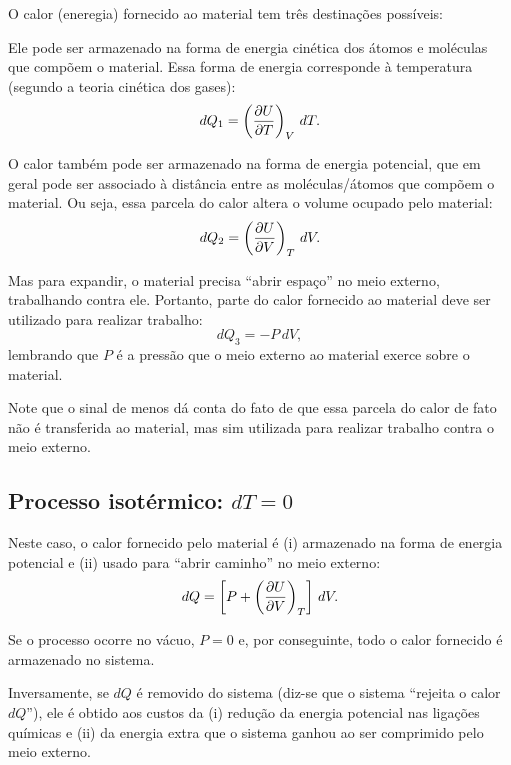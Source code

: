 \documentclass[a4paper,12pt]{scrartcl}
\begin{document}
  O calor (eneregia) fornecido ao material tem três destinações possíveis:
  \begin{compactenum}
  \item Ele pode ser armazenado na forma de energia cinética dos átomos e moléculas que compõem o material.
  Essa forma de energia corresponde à temperatura (segundo a teoria cinética dos gases):
  \begin{equation*}
  dQ_1 = \left(\frac{\partial U}{\partial T}\right)_{V}\, dT.
  \end{equation*}

  \item O calor também pode ser armazenado na forma de energia potencial, que em geral pode ser associado à distância entre as moléculas/átomos que compõem o material. Ou seja, essa parcela do calor altera o volume ocupado pelo material:
  \begin{equation*}
  dQ_2 = \left(\frac{\partial U}{\partial V}\right)_{T}\, dV.
  \end{equation*}
  
  \item Mas para expandir, o material precisa ``abrir espaço'' no meio externo, trabalhando contra ele. Portanto, parte do calor fornecido ao material deve ser utilizado para realizar trabalho:
  \begin{equation*}
  dQ_3 = -P\, dV,
  \end{equation*}
  lembrando que $P$ é a pressão que o meio externo ao material exerce sobre o material.
  
  Note que o sinal de menos dá conta do fato de que essa parcela do calor de fato não é transferida ao material, mas sim utilizada para realizar trabalho contra o meio externo.
  \end{compactenum}

  \subsection{Processo isotérmico: $dT = 0$}
    
  Neste caso, o calor fornecido pelo material é (i) armazenado na forma de energia potencial e (ii) usado para ``abrir caminho'' no meio externo:
  \begin{equation*}
  dQ = \left[P + \left(\frac{\partial U}{\partial V}\right)_{T}\right]\, dV.
  \end{equation*}
  
  Se o processo ocorre no vácuo, $P = 0$ e, por conseguinte, todo o calor fornecido é armazenado no sistema.
  
  Inversamente, se $dQ$ é removido do sistema (diz-se que o sistema ``rejeita o calor $dQ$''), ele é obtido aos custos da (i) redução da energia potencial nas ligações químicas e (ii) da energia extra que o sistema ganhou ao ser comprimido pelo meio externo.
  
\end{document}
